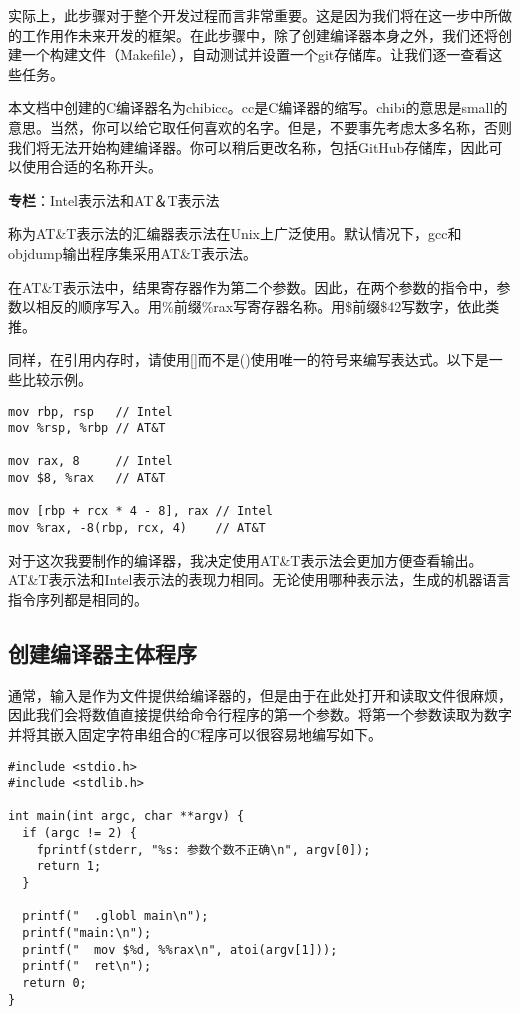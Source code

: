 \documentclass[cn,10pt,math=newtx,citestyle=gb7714-2015,bibstyle=gb7714-2015]{elegantbook}
\begin{document}
实际上，此步骤对于整个开发过程而言非常重要。这是因为我们将在这一步中所做的工作用作未来开发的框架。在此步骤中，除了创建编译器本身之外，我们还将创建一个构建文件（Makefile），自动测试并设置一个git存储库。让我们逐一查看这些任务。

本文档中创建的C编译器名为chibicc。cc是C编译器的缩写。chibi的意思是small的意思。当然，你可以给它取任何喜欢的名字。但是，不要事先考虑太多名称，否则我们将无法开始构建编译器。你可以稍后更改名称，包括GitHub存储库，因此可以使用合适的名称开头。

\begin{tcolorbox}
    \begin{tcolorbox}
\textbf{专栏}：Intel表示法和AT＆T表示法

称为AT\&T表示法的汇编器表示法在Unix上广泛使用。默认情况下，gcc和objdump输出程序集采用AT\&T表示法。

在AT\&T表示法中，结果寄存器作为第二个参数。因此，在两个参数的指令中，参数以相反的顺序写入。用\%前缀\%rax写寄存器名称。用\$前缀\$42写数字，依此类推。

同样，在引用内存时，请使用[]而不是()使用唯一的符号来编写表达式。以下是一些比较示例。

\begin{verbatim}
mov rbp, rsp   // Intel
mov %rsp, %rbp // AT&T

mov rax, 8     // Intel
mov $8, %rax   // AT&T

mov [rbp + rcx * 4 - 8], rax // Intel
mov %rax, -8(rbp, rcx, 4)    // AT&T
\end{verbatim}

对于这次我要制作的编译器，我决定使用AT\&T表示法会更加方便查看输出。AT\&T表示法和Intel表示法的表现力相同。无论使用哪种表示法，生成的机器语言指令序列都是相同的。
    \end{tcolorbox}
\end{tcolorbox}

\subsection{创建编译器主体程序}

通常，输入是作为文件提供给编译器的，但是由于在此处打开和读取文件很麻烦，因此我们会将数值直接提供给命令行程序的第一个参数。将第一个参数读取为数字并将其嵌入固定字符串组合的C程序可以很容易地编写如下。

\begin{verbatim}
#include <stdio.h>
#include <stdlib.h>

int main(int argc, char **argv) {
  if (argc != 2) {
    fprintf(stderr, "%s: 参数个数不正确\n", argv[0]);
    return 1;
  }

  printf("  .globl main\n");
  printf("main:\n");
  printf("  mov $%d, %%rax\n", atoi(argv[1]));
  printf("  ret\n");
  return 0;
}
\end{verbatim}
\end{document}
